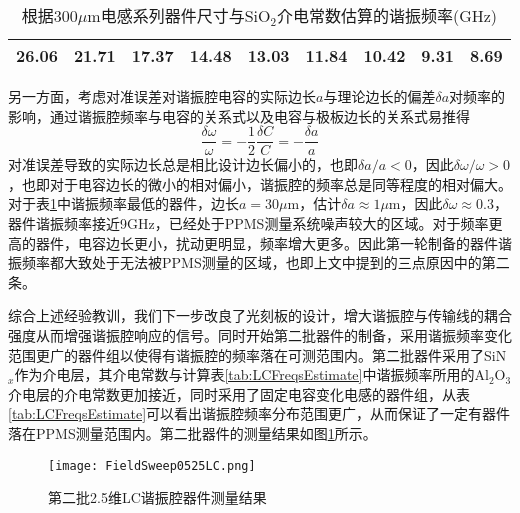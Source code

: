\begin{table}[htb]
  \centering
  \caption{根据$300\mu$m电感系列器件尺寸与SiO$_2$介电常数估算的谐振频率(GHz)}
  \label{tab:LCActualFreqsEstimate}
    \begin{tabular}{ccccccccc} %
      \toprule %
      26.06 & 21.71 & 17.37 & 14.48 & 13.03 & 11.84 & 10.42 & 9.31 & 8.69\\
      \bottomrule %
    \end{tabular}
\end{table}

            另一方面，考虑对准误差对谐振腔电容的实际边长$a$与理论边长的偏差$ \delta a $对频率的影响，通过谐振腔频率与电容的关系式以及电容与极板边长的关系式易推得
            \begin{equation}
                \frac{\delta \omega}{\omega} =  - \frac{1}{2} \frac{\delta C}{C} = -\frac{\delta a}{a}
            \end{equation}
            对准误差导致的实际边长总是相比设计边长偏小的，也即$ \delta a/a < 0$，因此$ \delta \omega/\omega >0$，也即对于电容边长的微小的相对偏小，谐振腔的频率总是同等程度的相对偏大。对于表\ref{tab:LCActualFreqsEstimate}中谐振频率最低的器件，边长$a = 30\mu$m，估计$\delta a \approx 1\mu $m，因此$\delta \omega \approx 0.3$，器件谐振频率接近9GHz，已经处于PPMS测量系统噪声较大的区域。对于频率更高的器件，电容边长更小，扰动更明显，频率增大更多。因此第一轮制备的器件谐振频率都大致处于无法被PPMS测量的区域，也即上文中提到的三点原因中的第二条。
            




            综合上述经验教训，我们下一步改良了光刻板的设计，增大谐振腔与传输线的耦合强度从而增强谐振腔响应的信号。同时开始第二批器件的制备，采用谐振频率变化范围更广的器件组以使得有谐振腔的频率落在可测范围内。第二批器件采用了SiN$_x$作为介电层，其介电常数与计算表\ref{tab:LCFreqsEstimate}中谐振频率所用的Al$_2$O$_3$介电层的介电常数更加接近，同时采用了固定电容变化电感的器件组，从表\ref{tab:LCFreqsEstimate}可以看出谐振腔频率分布范围更广，从而保证了一定有器件落在PPMS测量范围内。第二批器件的测量结果如图\ref{fig:LC_R2_meas}所示。



            \begin{figure}[h]
                \centering
                \texttt{[image: FieldSweep0525LC.png]}
                \caption{第二批2.5维LC谐振腔器件测量结果}
                \label{fig:LC_R2_meas}
            \end{figure}

